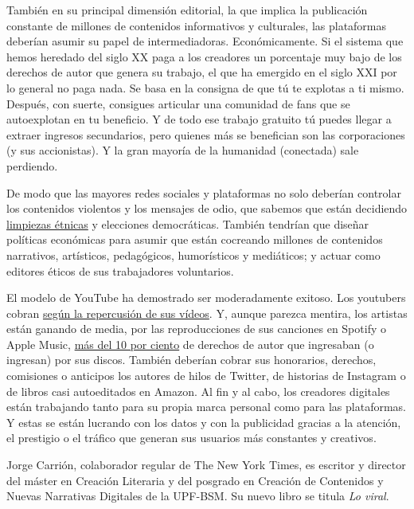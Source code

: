 También en su principal dimensión editorial, la que implica la
publicación constante de millones de contenidos informativos y
culturales, las plataformas deberían asumir su papel de intermediadoras.
Económicamente. Si el sistema que hemos heredado del siglo XX paga a los
creadores un porcentaje muy bajo de los derechos de autor que genera su
trabajo, el que ha emergido en el siglo XXI por lo general no paga nada.
Se basa en la consigna de que tú te explotas a ti mismo. Después, con
suerte, consigues articular una comunidad de fans que se autoexplotan en
tu beneficio. Y de todo ese trabajo gratuito tú puedes llegar a extraer
ingresos secundarios, pero quienes más se benefician son las
corporaciones (y sus accionistas). Y la gran mayoría de la humanidad
(conectada) sale perdiendo.

De modo que las mayores redes sociales y plataformas no solo deberían
controlar los contenidos violentos y los mensajes de odio, que sabemos
que están decidiendo
\href{https://www.nytimes.com/es/2018/10/18/espanol/facebook-violencia-rohinya-birmania.html}{limpiezas
étnicas} y elecciones democráticas. También tendrían que diseñar
políticas económicas para asumir que están cocreando millones de
contenidos narrativos, artísticos, pedagógicos, humorísticos y
mediáticos; y actuar como editores éticos de sus trabajadores
voluntarios.

El modelo de YouTube ha demostrado ser moderadamente exitoso. Los
youtubers cobran
\href{https://www.nytimes.com/2008/12/11/business/media/11youtube.html}{según
la repercusión de sus vídeos}. Y, aunque parezca mentira, los artistas
están ganando de media, por las reproducciones de sus canciones en
Spotify o Apple Music,
\href{https://www.businessinsider.es/cuantas-reproducciones-spotify-necesitan-ganar-1-euro-491653}{más
del 10 por ciento} de derechos de autor que ingresaban (o ingresan) por
sus discos. También deberían cobrar sus honorarios, derechos, comisiones
o anticipos los autores de hilos de Twitter, de historias de Instagram o
de libros casi autoeditados en Amazon. Al fin y al cabo, los creadores
digitales están trabajando tanto para su propia marca personal como para
las plataformas. Y estas se están lucrando con los datos y con la
publicidad gracias a la atención, el prestigio o el tráfico que generan
sus usuarios más constantes y creativos.

Jorge Carrión, colaborador regular de The New York Times, es escritor y
director del máster en Creación Literaria y del posgrado en Creación de
Contenidos y Nuevas Narrativas Digitales de la UPF-BSM. Su nuevo libro
se titula \emph{Lo viral}.

